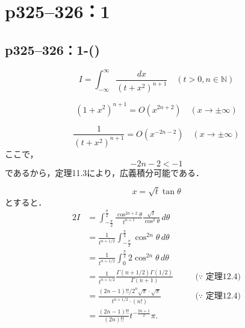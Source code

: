 \documentclass[a4paper,10pt,fleqn]{ltjsarticle}
\begin{document}

\newpage


\section*{p325--326：1}


\subsection*{p325--326：1-()}

\begin{tleftbar}
    \[
        I = \int_{-\infty}^{\infty} \frac{dx}{(t+x^2)^{n+1}} \quad (t > 0, n \in \mathbb{N})
    \]

    \[
        (1+x^2)^{n+1} = O(x^{2n+2}) \quad (x \to \pm \infty)
    \]

    \[
        \frac{1}{(t+x^2)^{n+1}} = O(x^{-2n-2}) \quad (x \to \pm \infty)
    \]
    ここで，
    \[
        -2n-2 < -1
    \]
    であるから，定理11.3により，広義積分可能である．

    \[
        x = \sqrt{t} \tan \theta
    \]
    とすると．
    \begin{alignat*}{2}
        I & = \int_{-\frac{\pi}{2}}^{\frac{\pi}{2}} \frac{\cos^{2n+2} \theta}{t^{n+1} } \frac{\sqrt{t}}{\cos^2 \theta} \, d \theta &       &                            \\
          & = \frac{1}{t^{n+1/2}} \int_{-\frac{\pi}{2}}^{\frac{\pi}{2}} \cos^{2n} \theta \, d\theta                                &       &                            \\
          & = \frac{1}{t^{n+1/2}} \int_{0}^{\frac{\pi}{2}} 2 \cos^{2n} \theta \, d\theta                                           &       &                            \\
          & = \frac{1}{t^{n+1/2}} \frac{\Gamma (n+1/2) \Gamma (1/2)}{\Gamma(n+1)}                                                  & \quad & \text{($\because$~定理12.4)} \\
          & = \frac{(2n-1)!! / 2^n \sqrt{\pi} \cdot \sqrt{\pi}}{t^{n+1/2} \cdot (n!)}                                              & \quad & \text{($\because$~定理12.4)} \\\
          & = \frac{(2n-1)!!}{(2n)!!} t^{ - \frac{2n+1}{2}} \pi .
    \end{alignat*}
\end{tleftbar}
\end{document}
